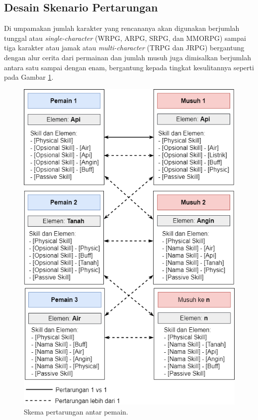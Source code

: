 \begin{subs}
	\subsection{Desain Skenario Pertarungan}
	\label{sec:sub_sec3_design_skenario}
	\vspace{1ex}
	
	Di umpamakan jumlah karakter yang rencananya akan digunakan berjumlah tunggal atau \textit{single-character} (WRPG, ARPG, SRPG, dan MMORPG) sampai tiga karakter atau jamak atau \textit{multi-character} (TRPG dan JRPG) bergantung dengan alur cerita dari permainan dan jumlah musuh juga dimisalkan berjumlah antara satu sampai dengan enam, bergantung kepada tingkat kesulitannya seperti pada Gambar \ref{fig:battle_player}. 
	\vspace{1ex}
	
	\begin{figure} [!h] \centering
		\includegraphics[scale=0.48]{img/battle_player_new.png}
		\caption{Skema pertarungan antar pemain.}
		\label{fig:battle_player}
	\end{figure}
	

\end{subs}

